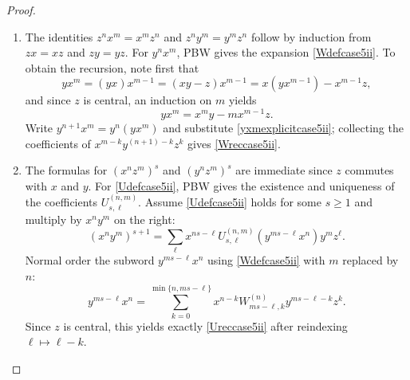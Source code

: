 \documentclass{amsart}
\theoremstyle{definition}
\theoremstyle{remark}
\numberwithin{equation}{section}
\begin{document}
\begin{proof}
\begin{enumerate}
\item [\rm (1)] The identities $z^n x^m=x^m z^n$ and $z^n y^m=y^m z^n$ follow by induction from $zx=xz$ and $zy=yz$. For $y^n x^m$, PBW gives the expansion \eqref{Wdefcase5ii}. To obtain the recursion, note first that
\begin{equation} \label{yxmcase5ii}
yx^m = (yx)x^{m-1} = (xy-z)x^{m-1} =  x(yx^{m-1})-x^{m-1}z, 
\end{equation}
and since $z$ is central, an induction on $m$ yields
\begin{equation}\label{yxmexplicitcase5ii}
yx^m=x^m y-m x^{m-1}z.
\end{equation}
Write $y^{n+1}x^m=y^n(yx^m)$ and substitute \eqref{yxmexplicitcase5ii}; collecting the coefficients of $x^{m-k}y^{(n+1)-k}z^k$ gives \eqref{Wreccase5ii}.

\item [\rm (2)] The formulas for $(x^n z^m)^s$ and $(y^n z^m)^s$ are immediate since $z$ commutes with $x$ and $y$. For \eqref{Udefcase5ii}, PBW gives the existence and uniqueness of the coefficients $U^{(n,m)}_{s,\ell}$.
Assume \eqref{Udefcase5ii} holds for some $s\ge 1$ and multiply by $x^n y^m$ on the right:
\[
(x^n y^m)^{s+1}=\sum_{\ell}x^{ns-\ell}U^{(n,m)}_{s,\ell} (y^{ms-\ell}x^n) y^m z^\ell.
\]
Normal order the subword $y^{ms-\ell}x^n$ using \eqref{Wdefcase5ii} with $m$ replaced by $n$:
\[
y^{ms-\ell}x^n=\sum_{k=0}^{\min\{n,ms-\ell\}}x^{n-k}W^{(n)}_{ms-\ell,k} y^{ms-\ell-k}z^k.
\]
Since $z$ is central, this yields exactly \eqref{Ureccase5ii} after reindexing $\ell\mapsto \ell-k$.


\end{enumerate}
\end{proof}
\end{document}
